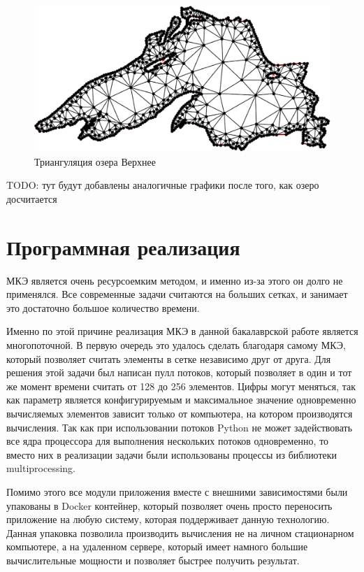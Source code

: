 \documentclass[14pt]{extreport}
\begin{document}
\begin{figure}[H]
\centerline{
\includegraphics[width=1.0\linewidth]{images/ex4/mesh}}
\caption{Триангуляция озера Верхнее}
\label{img:ex4:mesh}
\end{figure}

TODO: тут будут добавлены аналогичные графики после того, как озеро досчитается

\section{Программная реализация}

МКЭ является очень ресурсоемким методом, и именно из-за этого он долго не применялся. Все современные задачи считаются на больших сетках, и занимает это достаточно большое количество времени.

Именно по этой причине реализация МКЭ в данной бакалаврской работе является многопоточной. В первую очередь это удалось сделать благодаря самому МКЭ, который позволяет считать элементы в сетке независимо друг от друга. Для решения этой задачи был написан пулл потоков, который позволяет в один и тот же момент времени считать от 128 до 256 элементов. Цифры могут меняться, так как параметр является конфигурируемым и максимальное значение одновременно вычисляемых элементов зависит только от компьютера, на котором производятся вычисления. Так как при использовании потоков Python не может задействовать все ядра процессора для выполнения нескольких потоков одновременно, то вместо них в реализации задачи были использованы процессы из библиотеки multiprocessing.

Помимо этого все модули приложения вместе с внешними зависимостями были упакованы в Docker контейнер, который позволяет очень просто переносить приложение на любую систему, которая поддерживает данную технологию. Данная упаковка позволила производить вычисления не на личном стационарном компьютере, а на удаленном сервере, который имеет намного большие вычислительные мощности и позволяет быстрее получить результат.
\end{document}
